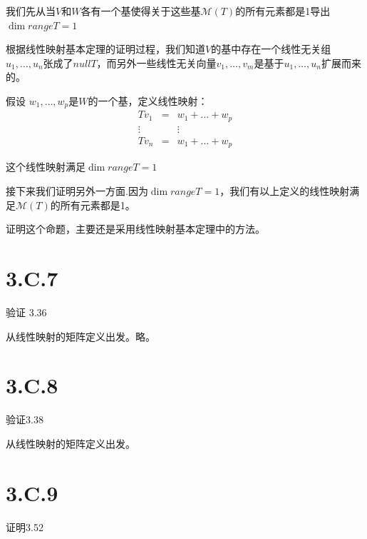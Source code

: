 \documentclass[10pt,a4paper,UTF8]{article}
\begin{document}
\begin{answer}
我们先从当\(V\)和\(W\)各有一个基使得关于这些基\(\mathcal{M}(T)\)的所有元素都是1导出\(\dim rangeT = 1\)

根据线性映射基本定理的证明过程，我们知道\(V\)的基中存在一个线性无关组\(u_{1},\ldots ,u_{n}\)张成了\(nullT\)，而另外一些线性无关向量\(v_{1},\ldots ,v_{m}\)是基于\(u_{1},\ldots ,u_{n}\)扩展而来的。


假设 \(w_{1},\ldots ,w_{p}\)是\(W\)的一个基，定义线性映射：
\begin{eqnarray*}
Tv_{1}&=&w_{1} + \ldots + w_{p} \\
\vdots && \vdots \\
Tv_{n}&=&w_{1} + \ldots + w_{p} 
\end{eqnarray*}

这个线性映射满足\(\dim range T = 1\)

接下来我们证明另外一方面.因为\(\dim rangeT = 1\)，我们有以上定义的线性映射满足\(\mathcal{M}(T)\)的所有元素都是1。

证明这个命题，主要还是采用线性映射基本定理中的方法。
\end{answer}
\section{3.C.7}
\label{sec:org27a05b8}


\begin{problem}
验证 3.36
\end{problem}

\begin{answer}
从线性映射的矩阵定义出发。略。
\end{answer}
\section{3.C.8}
\label{sec:org03c8ab7}


\begin{problem}
验证3.38
\end{problem}

\begin{answer}
从线性映射的矩阵定义出发。
\end{answer}

\section{3.C.9}
\label{sec:org0dbf459}


\begin{problem}
证明3.52
\end{problem}
\end{document}
